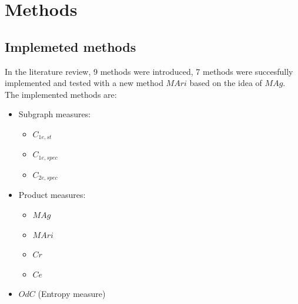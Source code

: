 \documentclass[12pt]{article}
\begin{document}
\section{Methods}
\subsection{Implemeted methods}
In the literature review, 9 methods were introduced, 7 methods were succesfully implemented and tested with a new method $MAri$ based on the idea of $MAg$. The implemented methods are:
\begin{itemize}
    \item Subgraph measures:
    \begin{itemize}
        \item $C_{1e,st}$
        \item $C_{1e,spec}$
        \item $C_{2e,spec}$
    \end{itemize}
    \item Product measures:
    \begin{itemize}
        \item $MAg$
        \item $MAri$
        \item $Cr$
        \item $Ce$
    \end{itemize}
    \item $OdC$ (Entropy measure)
\end{itemize}
\end{document}
